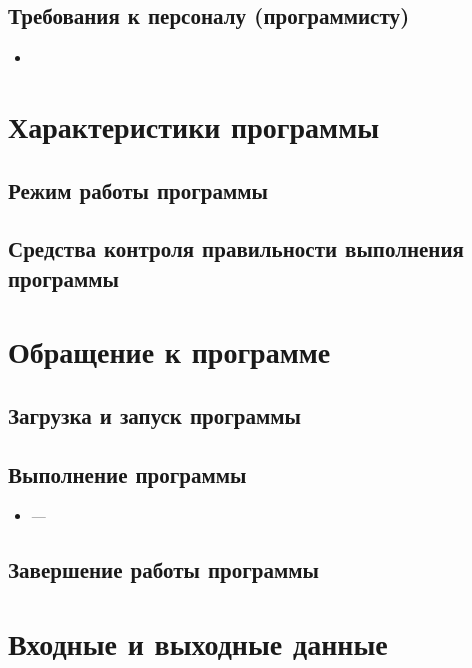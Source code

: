 \documentclass[allcolors=black]{article}
\begin{document}
\subsection{Требования к персоналу (программисту)}
\begin{itemize}
    \item {}
\end{itemize}

\section{Характеристики программы}
\subsection{Режим работы программы}

\subsection{Средства контроля правильности выполнения программы}

\section{Обращение к программе}
\subsection{Загрузка и запуск программы}

\subsection{Выполнение программы}
\begin{itemize}
    \item \textit{} --- 
\end{itemize}

\subsection{Завершение работы программы}

\section{Входные и выходные данные}
\end{document}
